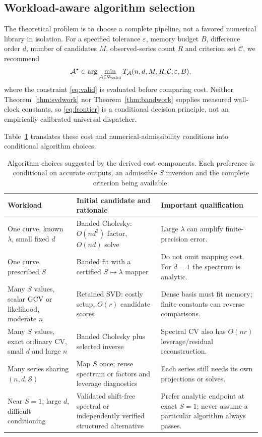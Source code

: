 \subsection{Workload-aware algorithm selection}\label{sec:policy}
The theoretical problem is to choose a complete pipeline, not a favored numerical library in isolation. For a specified tolerance $\varepsilon$, memory budget $B$, difference order $d$, number of candidates $M$, observed-series count $R$ and criterion set $\mathcal C$, we recommend
\begin{equation}\label{eq:frontier}
\mathcal A^\star\in
\arg\min_{\mathcal A\in\mathfrak A_{\rm valid}}
T_\mathcal A(n,d,M,R,\mathcal C;\varepsilon,B),
\end{equation}
where the constraint \eqref{eq:valid} is evaluated before comparing cost. Neither Theorem~\ref{thm:svdwork} nor Theorem~\ref{thm:bandwork} supplies measured wall-clock constants, so \eqref{eq:frontier} is a conditional decision principle, not an empirically calibrated universal dispatcher.

Table~\ref{tab:policy} translates these
cost and numerical-admissibility conditions into
conditional algorithm choices.

\begin{table}[t]
\caption{Algorithm choices suggested by the derived cost components. Each preference is conditional on accurate outputs, an admissible $S$ inversion and the complete criterion being available.}
\label{tab:policy}\centering\small
\setlength{\tabcolsep}{5pt}
\begin{tabularx}{\textwidth}{@{}p{}Xp{}@{}}
\toprule
Workload & Initial candidate and rationale & Important qualification\\
\midrule
One curve, known $\lambda$, small fixed $d$ & Banded Cholesky: $O(nd^2)$ factor, $O(nd)$ solve & Large $\lambda$ can amplify finite-precision error.\\
One curve, prescribed $S$ & Banded fit with a certified $S\mapsto\lambda$ mapper & Do not omit mapping cost. For $d=1$ the spectrum is analytic.\\
Many $S$ values, scalar GCV or likelihood, moderate $n$ & Retained SVD: costly setup, $O(r)$ candidate scores & Dense basis must fit memory; finite constants can reverse comparisons.\\
Many $S$ values, exact ordinary CV, small $d$ and large $n$ & Banded Cholesky plus selected inverse & Spectral CV also has $O(nr)$ leverage/residual reconstruction.\\
Many series sharing $(n,d,\mathcal S)$ & Map $S$ once; reuse spectrum or factors and leverage diagnostics & Each series still needs its own projections or solves.\\
Near $S=1$, large $d$, difficult conditioning & Validated shift-free spectral or independently verified structured alternative & Prefer analytic endpoint at exact $S=1$; never assume a particular algorithm always passes.\\
\bottomrule
\end{tabularx}
\end{table}

